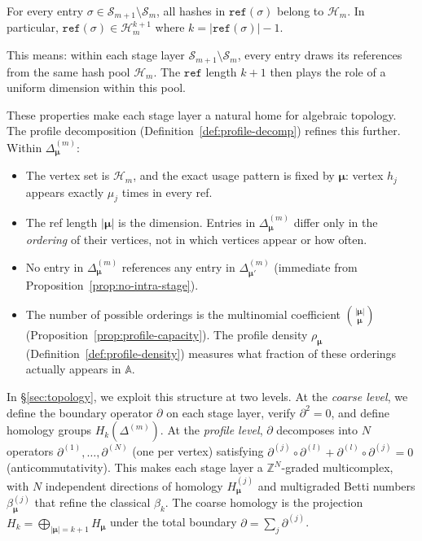 \begin{proposition}
\label{prop:uniform-pool}
For every entry $\sigma \in \mathcal{S}_{m+1} \setminus \mathcal{S}_m$, all hashes in $\texttt{ref}(\sigma)$ belong to $\mathcal{H}_m$. In particular, $\texttt{ref}(\sigma) \in \mathcal{H}_m^{k+1}$ where $k = |\texttt{ref}(\sigma)| - 1$.
\end{proposition}

This means: within each stage layer $\mathcal{S}_{m+1} \setminus \mathcal{S}_m$, every entry draws its references from the same hash pool $\mathcal{H}_m$. The $\texttt{ref}$ length $k+1$ then plays the role of a uniform dimension within this pool.

These properties make each stage layer a natural home for algebraic topology. The profile decomposition (Definition~\ref{def:profile-decomp}) refines this further. Within $\Delta^{(m)}_{\boldsymbol{\mu}}$:

\begin{itemize}
\item The vertex set is $\mathcal{H}_m$, and the exact usage pattern is fixed by $\boldsymbol{\mu}$: vertex $h_j$ appears exactly $\mu_j$ times in every ref.
\item The ref length $|\boldsymbol{\mu}|$ is the dimension. Entries in $\Delta^{(m)}_{\boldsymbol{\mu}}$ differ only in the \emph{ordering} of their vertices, not in which vertices appear or how often.
\item No entry in $\Delta^{(m)}_{\boldsymbol{\mu}}$ references any entry in $\Delta^{(m)}_{\boldsymbol{\mu}'}$ (immediate from Proposition~\ref{prop:no-intra-stage}).
\item The number of possible orderings is the multinomial coefficient $\binom{|\boldsymbol{\mu}|}{\boldsymbol{\mu}}$ (Proposition~\ref{prop:profile-capacity}). The profile density $\rho_{\boldsymbol{\mu}}$ (Definition~\ref{def:profile-density}) measures what fraction of these orderings actually appears in $\mathbb{A}$.
\end{itemize}

In \S\ref{sec:topology}, we exploit this structure at two levels. At the \emph{coarse level}, we define the boundary operator $\partial$ on each stage layer, verify $\partial^2 = 0$, and define homology groups $H_k(\Delta^{(m)})$. At the \emph{profile level}, $\partial$ decomposes into $N$ operators $\partial^{(1)}, \ldots, \partial^{(N)}$ (one per vertex) satisfying $\partial^{(j)} \circ \partial^{(l)} + \partial^{(l)} \circ \partial^{(j)} = 0$ (anticommutativity). This makes each stage layer a $\mathbb{Z}^N$-graded multicomplex, with $N$ independent directions of homology $H^{(j)}_{\boldsymbol{\mu}}$ and multigraded Betti numbers $\beta^{(j)}_{\boldsymbol{\mu}}$ that refine the classical $\beta_k$. The coarse homology is the projection $H_k = \bigoplus_{|\boldsymbol{\mu}|=k+1} H_{\boldsymbol{\mu}}$ under the total boundary $\partial = \sum_j \partial^{(j)}$.
